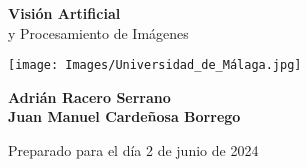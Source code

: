 \begin{titlepage}
    \begin{center}
    {\fontsize{40}{48}\selectfont \bfseries Visión Artificial} 
    \\\vspace{20pt}
    {\LARGE y Procesamiento de Imágenes} \\
    \vspace{20pt}
    
    \vfill %

        \texttt{[image: Images/Universidad\_de\_Málaga.jpg]}

        \vfill %
        \textbf{Adrián Racero Serrano \\ Juan Manuel Cardeñosa Borrego}

        Preparado para el día 2 de junio de 2024
    \end{center}
\end{titlepage}